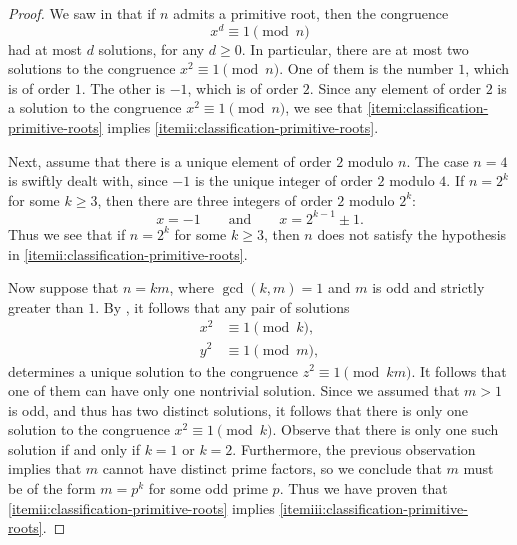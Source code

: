 \begin{proof}
  We saw in  that if $n$ admits a primitive root, then the congruence
  \begin{equation*}
    x^d\equiv 1\pmod{n}
  \end{equation*}
  had at most $d$ solutions, for any $d\geq 0$. In particular, there are at most two solutions to the congruence $x^2\equiv 1\pmod{n}$. One of them is the number $1$, which is of order $1$. The other is $-1$, which is of order $2$. Since any element of order $2$ is a solution to the congruence $x^2\equiv 1\pmod{n}$, we see that \ref{itemi:classification-primitive-roots} implies \ref{itemii:classification-primitive-roots}.

  Next, assume that there is a unique element of order $2$ modulo $n$. The case $n=4$ is swiftly dealt with, since $-1$ is the unique integer of order $2$ modulo $4$. If $n=2^k$ for some $k\geq 3$, then there are three integers of order $2$ modulo $2^k$:
  \begin{equation*}
    x=- 1\qquad\text{and}\qquad x=2^{k-1}\pm 1.
  \end{equation*}
  Thus we see that if $n=2^k$ for some $k\geq 3$, then $n$ does not satisfy the hypothesis in \ref{itemii:classification-primitive-roots}.

  Now suppose that $n=km$, where $\gcd(k,m)=1$ and $m$ is odd and strictly greater than $1$. By , it follows that any pair of solutions
  \begin{align*}
    x^2 & \equiv 1\pmod{k}, \\
    y^2 & \equiv 1\pmod{m},
  \end{align*}
  determines a unique solution to the congruence $z^2\equiv 1\pmod{km}$. It follows that one of them can have only one nontrivial solution. Since we assumed that $m>1$ is odd, and thus has two distinct solutions, it follows that there is only one solution to the congruence $x^2\equiv 1\pmod{k}$. Observe that there is only one such solution if and only if $k=1$ or $k=2$. Furthermore, the previous observation implies that $m$ cannot have distinct prime factors, so we conclude that $m$ must be of the form $m=p^k$ for some odd prime $p$. Thus we have proven that \ref{itemii:classification-primitive-roots} implies \ref{itemiii:classification-primitive-roots}.


\end{proof}
